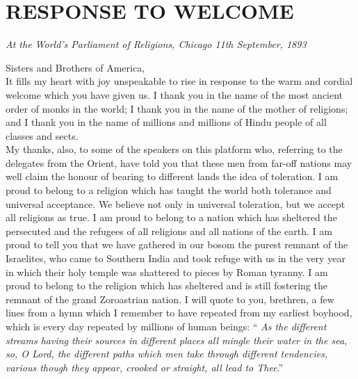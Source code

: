 \section{RESPONSE TO WELCOME}
\begin{center}\textit{ \textit{At the World's
Parliament of
Religions, Chicago }
 \textit{11th September, 1893}}\end{center}

Sisters and Brothers of America,\\

It fills my heart with joy unspeakable to rise in
response to
the warm and cordial welcome which you have given us. I thank you in
the name of the most ancient order of monks in the world; I thank you
in the name of the mother of religions; and I thank you in the name of
millions and millions of Hindu people of all classes and sects.\\

My thanks, also, to some of the speakers on this
platform who,
referring to the delegates from the Orient, have told you that these
men from far-off nations may well claim the honour of bearing to
different lands the idea of toleration. I am proud to belong to a
religion which has taught the world both tolerance and universal
acceptance. We believe not only in universal toleration, but we accept
all religions as true. I am proud to belong to a nation which has
sheltered the persecuted and the refugees of all religions and all
nations of the earth. I am proud to tell you that we have gathered in
our bosom the purest remnant of the Israelites, who came to Southern
India and took refuge with us in the very year in which their holy
temple was shattered to pieces by Roman tyranny. I am proud to belong
to the religion which has sheltered and is still fostering the remnant
of the grand Zoroastrian nation. I
will quote to you, brethren, a few lines from a hymn which I remember
to have repeated from my earliest boyhood, which is every day repeated
by millions of human beings: “ \textit{As the different streams having
their sources in different places all mingle their water in the sea,
so, O Lord, the different paths which men take through different
tendencies, various though they appear, crooked or straight, all lead
to Thee}.”\\

